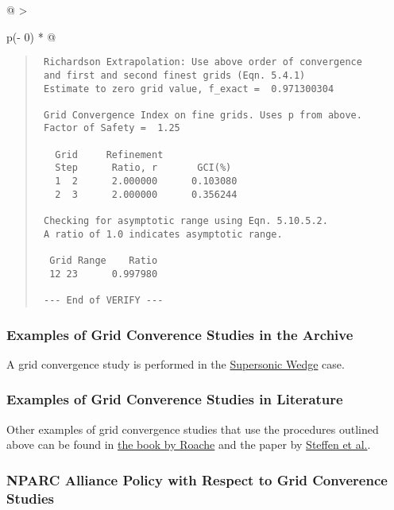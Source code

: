 \begin{longtable}[]{@{}
  >{\raggedright\arraybackslash}p{(\columnwidth - 0\tabcolsep) * }@{}}
\begin{minipage}[t]{\linewidth}
\begin{quote}
\begin{verbatim}
 Richardson Extrapolation: Use above order of convergence
 and first and second finest grids (Eqn. 5.4.1) 
 Estimate to zero grid value, f_exact =  0.971300304
  
 Grid Convergence Index on fine grids. Uses p from above.
 Factor of Safety =  1.25
  
   Grid     Refinement            
   Step      Ratio, r       GCI(%)
   1  2      2.000000      0.103080
   2  3      2.000000      0.356244
  
 Checking for asymptotic range using Eqn. 5.10.5.2.
 A ratio of 1.0 indicates asymptotic range.
  
  Grid Range    Ratio
  12 23      0.997980
  
 --- End of VERIFY ---
\end{verbatim}
\end{quote}

\hypertarget{examples-of-grid-converence-studies-in-the-archive}{%
\subsubsection{Examples of Grid Converence Studies in the
Archive}\label{examples-of-grid-converence-studies-in-the-archive}}

A grid convergence study is performed in the
\href{https://www.grc.nasa.gov/www/wind/valid/tutorial/wedge/wedge.html}{Supersonic
Wedge} case.

\hypertarget{examples-of-grid-converence-studies-in-literature}{%
\subsubsection{Examples of Grid Converence Studies in
Literature}\label{examples-of-grid-converence-studies-in-literature}}

Other examples of grid convergence studies that use the procedures
outlined above can be found in
\href{https://www.grc.nasa.gov/www/wind/valid/tutorial/bibliog.html\#Roachebook}{the
book by Roache} and the paper by
\href{https://www.grc.nasa.gov/www/wind/valid/tutorial/bibliog.html\#Steffen95}{Steffen
et al.}.

\hypertarget{nparc-alliance-policy-with-respect-to-grid-converence-studies}{%
\subsubsection{NPARC Alliance Policy with Respect to Grid Converence
Studies}\label{nparc-alliance-policy-with-respect-to-grid-converence-studies}}


\end{minipage}
\end{longtable}
